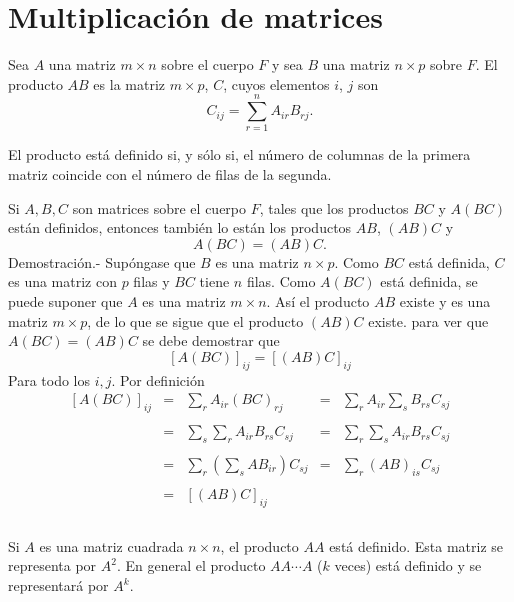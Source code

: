 \section{Multiplicación de matrices}

    \begin{def.}
	Sea $A$ una matriz $m\times n$ sobre el cuerpo $F$ y sea $B$ una matriz $n\times p$ sobre $F$. El producto $AB$ es la matriz $m\times p$, $C$, cuyos elementos $i$, $j$ son
	$$C_{ij} = \sum_{r=1}^n A_{ir}B_{rj}.$$
    \end{def.}

El producto está definido si, y sólo si, el número de columnas de la primera matriz coincide con el número de filas de la segunda.\\

\begin{teo}
    Si $A,B, C$ son matrices sobre el cuerpo $F$, tales que los productos $BC$ y $A(BC)$ están definidos, entonces también lo están los productos $AB$, $(AB)C$ y 
    $$A(BC)=(AB)C.$$
	Demostración.-\; Supóngase que $B$ es una matriz $n\times p$. Como $BC$ está definida, $C$ es una matriz con $p$ filas y $BC$ tiene $n$ filas. Como $A(BC)$ está definida, se puede suponer que $A$ es una matriz $m\times n$. Así el producto $AB$ existe y es una matriz $m\times p$, de lo que se sigue que el producto $(AB)C$ existe. para ver que $A(BC)=(AB)C$ se debe demostrar que
	$$\left[A(BC)\right]_{ij}=\left[(AB)C\right]_{ij}$$
	Para todo los $i,j$. Por definición
	$$\begin{array}{rclcl}
	    \left[A(BC)\right]_{ij} &=& \displaystyle\sum_{r} A_{ir}(BC)_{rj} &=& \displaystyle\sum_{r} A_{ir}\sum_{s} B_{rs}C_{sj}\\\\
				    &=& \displaystyle\sum_{s}\sum_{r} A_{ir}B_{rs}C_{sj} &=& \displaystyle\sum_{r}\sum_{s} A_{ir}B_{rs}C_{sj}\\\\
				    &=& \displaystyle\sum_{r}\left(\sum_{s} AB_{ir}\right)C_{sj} &=& \displaystyle\sum_{r} (AB)_{is}C_{sj}\\\\
				    &=& \left[(AB)C\right]_{ij} &&\\\\
	\end{array}$$
\end{teo}

Si $A$ es una matriz cuadrada $n\times n$, el producto $AA$ está definido. Esta matriz se representa por $A^2$. En general el producto $AA\cdots A$ ($k$ veces) está definido y se representará por $A^k$.

